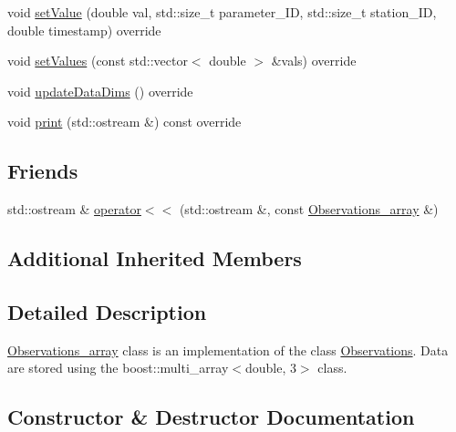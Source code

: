 \begin{DoxyCompactItemize}
\item 
void \mbox{\hyperlink{class_observations__array_a3994f0e11a8207c5e1182a9b20a67ec4}{set\+Value}} (double val, std\+::size\+\_\+t parameter\+\_\+\+ID, std\+::size\+\_\+t station\+\_\+\+ID, double timestamp) override
\item 
void \mbox{\hyperlink{class_observations__array_ae4ed49512506eae597a158d4c87dbd31}{set\+Values}} (const std\+::vector$<$ double $>$ \&vals) override
\item 
void \mbox{\hyperlink{class_observations__array_aa9364c4356d1f8a2b430c93a1fcd021f}{update\+Data\+Dims}} () override
\item 
void \mbox{\hyperlink{class_observations__array_a2563545e5a38ec7e3ec09380c0b38855}{print}} (std\+::ostream \&) const override
\end{DoxyCompactItemize}
\subsection*{Friends}
\begin{DoxyCompactItemize}
\item 
std\+::ostream \& \mbox{\hyperlink{class_observations__array_affb01c6a2af2ae2b833f7edec435234d}{operator$<$$<$}} (std\+::ostream \&, const \mbox{\hyperlink{class_observations__array}{Observations\+\_\+array}} \&)
\end{DoxyCompactItemize}
\subsection*{Additional Inherited Members}


\subsection{Detailed Description}
\mbox{\hyperlink{class_observations__array}{Observations\+\_\+array}} class is an implementation of the class \mbox{\hyperlink{class_observations}{Observations}}. Data are stored using the boost\+::multi\+\_\+array$<$double, 3$>$ class. 

\subsection{Constructor \& Destructor Documentation}
\mbox{\label{class_observations__array_ad161de2b3dd6537a040c2dbda002ccaf}} 
